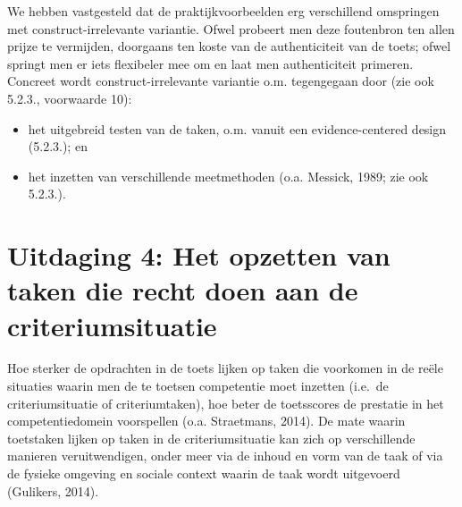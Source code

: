 \documentclass[
  letterpaper,
]{report}
\providecommand{\tightlist}{%
  \setlength{\itemsep}{0pt}\setlength{\parskip}{0pt}}
\begin{document}
We hebben vastgesteld dat de praktijkvoorbeelden erg verschillend
omspringen met construct-irrelevante variantie. Ofwel probeert men deze
foutenbron ten allen prijze te vermijden, doorgaans ten koste van de
authenticiteit van de toets; ofwel springt men er iets flexibeler mee om
en laat men authenticiteit primeren. Concreet wordt
construct-irrelevante variantie o.m. tegengegaan door (zie ook 5.2.3.,
voorwaarde 10):

\begin{itemize}
\tightlist
\item
  het uitgebreid testen van de taken, o.m. vanuit een evidence-centered
  design (5.2.3.); en
\item
  het inzetten van verschillende meetmethoden (o.a. Messick, 1989; zie
  ook 5.2.3.).
\end{itemize}

\hypertarget{uitdaging-4-het-opzetten-van-taken-die-recht-doen-aan-de-criteriumsituatie}{%
\section{Uitdaging 4: Het opzetten van taken die recht doen aan de
criteriumsituatie}\label{uitdaging-4-het-opzetten-van-taken-die-recht-doen-aan-de-criteriumsituatie}}

Hoe sterker de opdrachten in de toets lijken op taken die voorkomen in
de reële situaties waarin men de te toetsen competentie moet inzetten
(i.e.~de criteriumsituatie of criteriumtaken), hoe beter de toetsscores
de prestatie in het competentiedomein voorspellen (o.a. Straetmans,
2014). De mate waarin toetstaken lijken op taken in de criteriumsituatie
kan zich op verschillende manieren veruitwendigen, onder meer via de
inhoud en vorm van de taak of via de fysieke omgeving en sociale context
waarin de taak wordt uitgevoerd (Gulikers, 2014).
\end{document}
